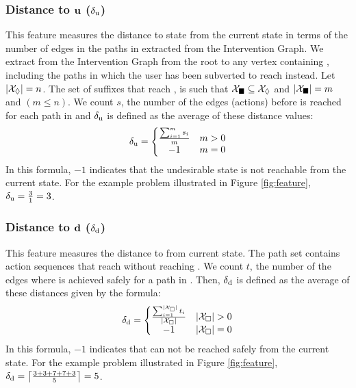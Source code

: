 \subsubsection{Distance to $\boldsymbol{\mathrm{u}}$ ($\delta_\mathrm{u}$)} 
This feature measures the distance to state \undesired from the current state in terms of the number of edges in the paths in \Suffixes extracted from the Intervention Graph. 
We extract \Suffixes from the Intervention Graph from the root to any vertex containing \desired, including the paths in which the user has been subverted to reach \undesired instead. 
Let $\left | \mathcal{X}_\Diamond \right |=n$. 
The set of suffixes that reach \undesired, \SuffixesUnsafe is such that $\mathcal{X}_{\blacksquare} \subseteq \mathcal{X}_\Diamond$ and $\left | \mathcal{X}_{\blacksquare} \right |=m$ and $(m\leq n)$.
We count  $s$, the number of the edges (actions) before \undesired is reached for each path in \SuffixesUnsafe and $\delta_\mathrm{u}$ is defined as the average of these distance values:
\begin{equation*} 
\delta_\mathrm{u} = \left\{\begin{matrix}
\frac{\sum_{i=1}^{m}s_i}{m} & m>0\\ 
-1 &  m=0
\end{matrix}\right.
\end{equation*} 
In this formula, $-1$ indicates that the undesirable state is not reachable from the current state. For the example problem illustrated in Figure \ref{fig:feature}, $\delta_\mathrm{u}=\frac{3}{1}=3$.

\subsubsection{Distance to $\boldsymbol{\mathrm{d}}$ ($\delta_\mathrm{d}$)} 
This feature measures the distance to \desired from current state. The path set \SuffixesSafe contains action sequences that reach \desired without reaching \undesired.
We count  $t$, the number of the edges where \desired is achieved safely for a path in \SuffixesSafe. 
Then, $\delta_\mathrm{d}$ is defined as the average of these distances given by the formula:
\begin{equation*} 
\delta_\desired = \left\{\begin{matrix}
\frac{\sum_{i=1}^{|\SuffixesSafe|}t_i}{|\SuffixesSafe|} & |\SuffixesSafe|>0\\ 
-1 &  |\SuffixesSafe|=0
\end{matrix}\right.
\end{equation*}
In this formula, $-1$ indicates that \desired can not be reached safely from the current state. For the example problem illustrated in Figure \ref{fig:feature}, $\delta_\mathrm{d}=\left \lceil \frac{3+3+7+7+3}{5} \right \rceil=5$.


